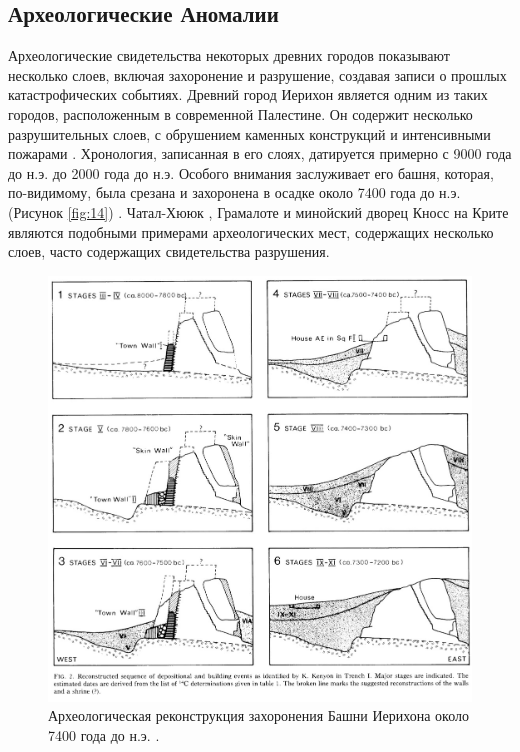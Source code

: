 \documentclass[10pt,twocolumn,letterpaper]{article}
\begin{document}
\subsection{Археологические Аномалии}

Археологические свидетельства некоторых древних городов показывают несколько слоев, включая захоронение и разрушение, создавая записи о прошлых катастрофических событиях. Древний город Иерихон является одним из таких городов, расположенным в современной Палестине. Он содержит несколько разрушительных слоев, с обрушением каменных конструкций и интенсивными пожарами \cite{96,97}. Хронология, записанная в его слоях, датируется примерно с 9000 года до н.э. до 2000 года до н.э. Особого внимания заслуживает его башня, которая, по-видимому, была срезана и захоронена в осадке около 7400 года до н.э. (Рисунок \ref{fig:14}) \cite{95}. Чатал-Хююк \cite{99}, Грамалоте \cite{98} и минойский дворец Кносс на Крите \cite{100,101} являются подобными примерами археологических мест, содержащих несколько слоев, часто содержащих свидетельства разрушения.

\begin{figure}[b]
\begin{center}
   \includegraphics[width=1\linewidth]{jericho.jpg}
\end{center}
   \caption{Археологическая реконструкция захоронения Башни Иерихона около 7400 года до н.э. \cite{95}.}
\label{fig:14}
\label{fig:onecol}
\end{figure}
\end{document}

